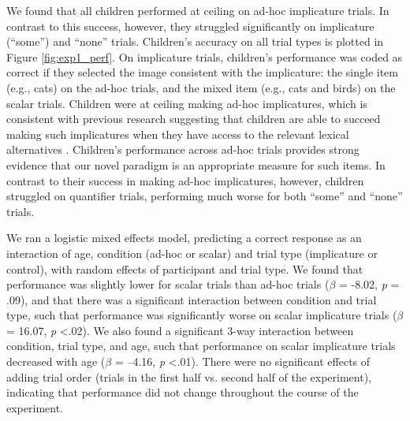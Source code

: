 \documentclass[man]{apa2}
\begin{document}
We found that all children performed at ceiling on ad-hoc implicature trials. In contrast to this success, however, they struggled significantly on implicature (``some'') and ``none'' trials. Children's accuracy on all trial types is plotted in Figure \ref{fig:exp1_perf}. On implicature trials, children's performance was coded as correct if they selected the image consistent with the implicature: the single item (e.g., cats) on the ad-hoc trials, and the mixed item (e.g., cats and birds) on the scalar trials. Children were at ceiling making ad-hoc implicatures, which is consistent with previous research suggesting that children are able to succeed making such implicatures when they have access to the relevant lexical alternatives \cite{stiller2014}. Children's performance across ad-hoc trials provides strong evidence that our novel paradigm is an appropriate measure for such items. In contrast to their success in making ad-hoc implicatures, however, children struggled on quantifier trials, performing much worse for both ``some'' and ``none'' trials.


We ran a logistic mixed effects model, predicting a correct response as an interaction of age, condition (ad-hoc or scalar) and trial type (implicature or control), with random effects of participant and trial type. We found that performance was slightly lower for scalar trials than ad-hoc trials ($\beta$ = -8.02, \textit{p} = .09), and that there was a significant interaction between condition and trial type, such that performance was significantly worse on scalar implicature trials ($\beta$ = 16.07, \textit{p} \textless  .02). We also found a significant 3-way interaction between condition, trial type, and age, such that performance on scalar implicature trials decreased with age ($\beta$ = --4.16, \textit{p} \textless  .01). There were no significant effects of adding trial order (trials in the first half vs. second half of the experiment), indicating that performance did not change throughout the course of the experiment.
\end{document}
